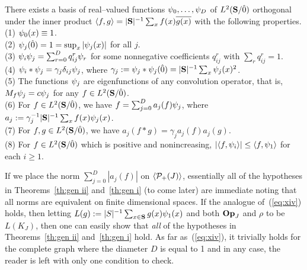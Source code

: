 \begin{lem} \label{lem:scheme}
There exists a basis of real--valued functions 
$\f_0 , \ldots , \f_D$ of $\ltsg$ 
orthogonal under the inner product 
$\langle f , g\rangle = |\S|^{-1} \sum_x f(x) 
\overline{g(x)}$ with the following properties. \\
(1) $\f_0 (x) \equiv 1$. \\
(2) $\f_j (\zero) = 1 = \sup_x |\f_j (x)|$ for all $j$. \\
(3) $\f_i \f_j = \sum_{r=0}^D q^r_{ij} \f_r$ for some nonnegative coefficients
   $q^r_{ij}$ with $\sum_r q^r_{ij} = 1$. \\
(4) $\f_i * \f_j = \gamma_j \delta_{ij} \f_j$, where $\gamma_j : = \f_j * \f_j
   (\zero) = |\S|^{-1} \sum_x \f_j (x)^2$. \\
(5) The functions $\f_j$ are eigenfunctions of any convolution
   operator, that is, $M_f \f_j = c \f_j$ for any $f \in \ltsg$. \\
(6) For $f \in \ltsg$, we have $f = \sum_{j=0}^D a_j(f) \f_j$, where
   $a_j : = \gamma_j^{-1} |\S|^{-1} \sum_x f(x) \f_j (x)$. \\
(7) For $f,g \in \ltsg$, we have $a_j(f * g)= \gamma_j a_j(f) a_j(g)$. \\
(8) For $f\in \ltsg$ which is positive and nonincreasing, 
$|\langle f , \f_i\rangle|\le  \langle f , \f_1\rangle $
for each $i\ge 1$.
\end{lem}

If we place the norm $\sum_{j=0}^D |a_j(f)|$ on $\sspj$, essentially all of the
hypotheses in Theorems~\ref{th:gen ii} and~\ref{th:gen i} (to come later) are 
immediate noting that all norms are equivalent on finite dimensional spaces.
If the analogue of~(\ref{eq:xiv}) holds, then letting
$L (g):= |S|^{-1}\sum_{x\in\S}g(x)\f_1(x)$ and both $\op $ and $\rho$ to
be $L(K_J)$, then one can easily show that {\it all} of the 
hypotheses in Theorems~\ref{th:gen ii} and~\ref{th:gen i} hold.
As far as~(\ref{eq:xiv}), it trivially holds for the complete graph where the 
diameter $D$ is equal to 1 and in any case, the reader is left with only one 
condition to check.

